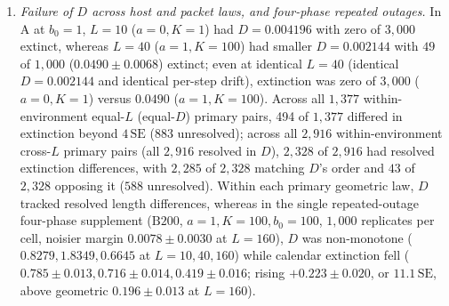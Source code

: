 \begin{enumerate}
\item \emph{Failure of $D$ across host and packet laws, and four-phase repeated outages.} In $\mathrm{A}$ at $b_0 = 1$, $L = 10$ ($a = 0, K = 1$) had $D = 0.004196$ with zero of $3{,}000$ extinct, whereas $L = 40$ ($a = 1, K = 100$) had smaller $D = 0.002144$ with $49$ of $1{,}000$ ($0.0490 \pm 0.0068$) extinct; even at identical $L = 40$ (identical $D = 0.002144$ and identical per-step drift), extinction was zero of $3{,}000$ ($a = 0, K = 1$) versus $0.0490$ ($a = 1, K = 100$). Across all $1{,}377$ within-environment equal-$L$ (equal-$D$) primary pairs, 494 of $1{,}377$ differed in extinction beyond $4\,\mathrm{SE}$ ($883$ unresolved); across all $2{,}916$ within-environment cross-$L$ primary pairs (all $2{,}916$ resolved in $D$), $2{,}328$ of $2{,}916$ had resolved extinction differences, with $2{,}285$ of $2{,}328$ matching $D$'s order and $43$ of $2{,}328$ opposing it ($588$ unresolved). Within each primary geometric law, $D$ tracked resolved length differences, whereas in the single repeated-outage four-phase supplement ($\mathrm{B200}$, $a = 1, K = 100, b_0 = 100$, $1{,}000$ replicates per cell, noisier margin $0.0078 \pm 0.0030$ at $L = 160$), $D$ was non-monotone ($0.8279, 1.8349, 0.6645$ at $L = 10, 40, 160$) while calendar extinction fell ($0.785 \pm 0.013, 0.716 \pm 0.014, 0.419 \pm 0.016$; rising $+0.223 \pm 0.020$, or $11.1\,\mathrm{SE}$, above geometric $0.196 \pm 0.013$ at $L = 160$).
\end{enumerate}


